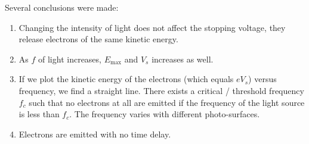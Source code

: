 \documentclass[a4paper,12pt]{article}
\begin{document}
Several conclusions were made:
\begin{enumerate}
  \item Changing the intensity of light does not affect the stopping voltage, they release electrons of the same kinetic energy.
  \item As $f$ of light increases, $E_\text{max}$ and $V_s$ increases as well.
  \item If we plot the kinetic energy of the electrons (which equals $eV_s$) versus frequency, we find a straight line. There exists a critical / threshold frequency $f_c$ such that no electrons at all are emitted if the frequency of the light source is less than $f_c$. The frequency varies with different photo-surfaces.
  \item Electrons are emitted with no time delay.
\end{enumerate}
\end{document}
